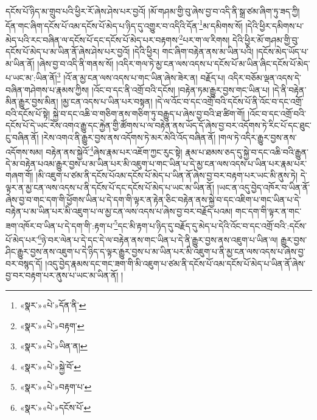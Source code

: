 དངོས་པོ་ཉིད་མ་གྲུབ་པའི་ཕྱིར་རོ་ཞེས་ཤེས་པར་བྱའོ། །མོ་གཤམ་གྱི་བུ་ཞེས་བྱ་བ་འདི་ནི་སྒྲ་ཙམ་ཞིག་ཏུ་ཟད་ཀྱི། དོན་གང་ཞིག་དངོས་པོ་འམ་དངོས་པོ་མེད་པ་ཉིད་དུ་འགྱུར་བ་འདིའི་དོན་\footnote{«སྣར་»«པེ་»དོན་ནི་}མ་དམིགས་སོ། །དེའི་ཕྱིར་དམིགས་པ་མེད་པའི་རང་བཞིན་ལ་དངོས་པོ་དང་དངོས་པོ་མེད་པར་བརྟགས་\footnote{«སྣར་»«པེ་»བརྟག་}པར་ག་ལ་རིགས། དེའི་ཕྱིར་མོ་གཤམ་གྱི་བུ་དངོས་པོ་མེད་པ་མ་ཡིན་ནོ་ཞེས་ཤེས་པར་བྱའོ། །དེའི་ཕྱིར། གང་ཞིག་བརྟེན་ནས་མ་ཡིན་པའི། །དངོས་མེད་ཡོད་པ་མ་ཡིན་ནོ། །ཞེས་བྱ་བ་འདི་ནི་གནས་སོ། །འདིར་གལ་ཏེ་མྱ་ངན་ལས་འདས་པ་དངོས་པོ་མ་ཡིན་ཞིང་དངོས་པོ་མེད་པ་ཡང་མ་:ཡིན་ནོ།\footnote{«སྣར་»«པེ་»ཡིན་ན།} །འོ་ན་མྱ་ངན་ལས་འདས་པ་གང་ཡིན་ཞེས་ཟེར་ན། བརྗོད་པ། འདིར་བཅོམ་ལྡན་འདས་དེ་བཞིན་གཤེགས་པ་རྣམས་ཀྱིས། །འོང་བ་དང་ནི་འགྲོ་བའི་དངོས། །བརྟེན་ཏམ་རྒྱུར་བྱས་གང་ཡིན་པ། །དེ་ནི་བརྟེན་མིན་རྒྱུར་བྱས་མིན། །མྱ་ངན་འདས་པ་ཡིན་པར་བསྟན། །དེ་ལ་འོང་བ་དང་འགྲོ་བའི་དངོས་པོ་ནི་འོང་བ་དང་འགྲོ་བའི་དངོས་པོ་སྟེ། སྐྱེ་བ་དང་འཆི་བ་གཅིག་ནས་གཅིག་ཏུ་བརྒྱུད་པ་ཞེས་བྱ་བའི་ཐ་ཚིག་གོ། །འོང་བ་དང་འགྲོ་བའི་དངོས་པོ་དེ་ཡང་རེས་འགའ་རྒྱུ་དང་རྐྱེན་གྱི་ཚོགས་པ་ལ་བརྟེན་ནས་ཡོད་དོ་ཞེས་བྱ་བར་འདོགས་ཏེ་རིང་པོ་དང་ཐུང་ངུ་བཞིན་ནོ། །རེས་འགའ་ནི་རྒྱུར་བྱས་ནས་འདོགས་ཏེ་མར་མེའི་འོད་བཞིན་ནོ། །གལ་ཏེ་འདིར་རྒྱུར་བྱས་ནས་འདོགས་སམ། བརྟེན་ནས་སྐྱེའོ་\footnote{«སྣར་»«པེ་»སྐྱེ་བོ་}ཞེས་རྣམ་པར་འཇོག་ཀྱང་རུང་སྟེ། རྣམ་པ་ཐམས་ཅད་དུ་སྐྱེ་བ་དང་འཆི་བའི་རྒྱུན་དེ་མ་བརྟེན་པའམ་རྒྱུར་བྱས་པ་མ་ཡིན་པར་མི་འཇུག་པ་གང་ཡིན་པ་དེ་མྱ་ངན་ལས་འདས་པ་ཡིན་པར་རྣམ་པར་གཞག་གོ། །མི་འཇུག་པ་ཙམ་ནི་དངོས་པོའམ་དངོས་པོ་མེད་པ་ཡིན་ནོ་ཞེས་བྱ་བར་བརྟག་པར་ཡང་མི་ནུས་ཏེ། དེ་ལྟར་ན་མྱ་ངན་ལས་འདས་པ་ནི་དངོས་པོ་དང་དངོས་པོ་མེད་པ་ཡང་མ་ཡིན་ནོ། །ཡང་ན་འདུ་བྱེད་འཁོར་བ་ཡིན་ནོ་ཞེས་བྱ་བ་གང་དག་གི་ཕྱོགས་ཡིན་པ་དེ་དག་གི་ལྟར་ན་རྟེན་ཅིང་བརྟེན་ནས་སྐྱེ་བ་དང་འཇིག་པ་གང་ཡིན་པ་དེ་བརྟེན་པ་མ་ཡིན་པར་མི་འཇུག་པ་ལ་མྱ་ངན་ལས་འདས་པ་ཞེས་བྱ་བར་བརྗོད་པའམ། གང་དག་གི་ལྟར་ན་གང་ཟག་འཁོར་བ་ཡིན་པ་དེ་དག་གི་:རྟག་པ་\footnote{«སྣར་»«པེ་»བརྟག་པ་}དང་མི་རྟག་པ་ཉིད་དུ་བརྗོད་དུ་མེད་པ་དེའི་འོང་བ་དང་འགྲོ་བའི་:དངོས་པོ་མེད་པར་\footnote{«སྣར་»«པེ་»དངོས་པོ་}ཉེ་བར་ལེན་པ་དེ་དང་དེ་ལ་བརྟེན་ནས་གང་ཡིན་པ་དེ་ནི་རྒྱུར་བྱས་ནས་འཇུག་པ་ཡིན་ལ། རྒྱུར་བྱས་ཤིང་རྒྱུར་བྱས་ནས་འཇུག་པ་དེ་ཉིད་ད་ལྟར་རྒྱུར་བྱས་པ་མ་ཡིན་པར་མི་འཇུག་པ་ནི་མྱ་ངན་ལས་འདས་པ་ཞེས་བྱ་བར་བསྙད་དོ། །འདུ་བྱེད་རྣམས་དང་གང་ཟག་གི་མི་འཇུག་པ་ཙམ་ནི་དངོས་པོ་འམ་དངོས་པོ་མེད་པ་ཡིན་ནོ་ཞེས་བྱ་བར་བརྟག་པར་ནུས་པ་ཡང་མ་ཡིན་ནོ། །

